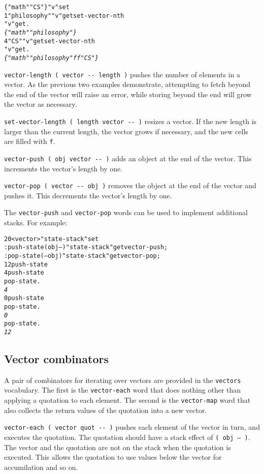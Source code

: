 \documentclass[english]{article}
\begin{document}
\begin{alltt}
\{ "math" "CS" \} "v" set
1 "philosophy" "v" get set-vector-nth
"v" get .
\emph{\{ "math" "philosophy" \}}
4 "CS" "v" get set-vector-nth
"v" get .
\emph{\{ "math" "philosophy" f f "CS" \}}
\end{alltt}
\texttt{vector-length ( vector -{}- length )} pushes the number of
elements in a vector. As the previous two examples demonstrate, attempting
to fetch beyond the end of the vector will raise an error, while storing
beyond the end will grow the vector as necessary.

\texttt{set-vector-length ( length vector -{}- )} resizes a vector.
If the new length is larger than the current length, the vector grows
if necessary, and the new cells are filled with \texttt{f}.

\texttt{vector-push ( obj vector -{}- )} adds an object at the end
of the vector. This increments the vector's length by one.

\texttt{vector-pop ( vector -{}- obj )} removes the object at the
end of the vector and pushes it. This decrements the vector's length
by one.

The \texttt{vector-push} and \texttt{vector-pop} words can be used to implement additional stacks. For example:

\begin{alltt}
20 <vector> "state-stack" set
: push-state ( obj -- ) "state-stack" get vector-push ;
: pop-state ( -- obj ) "state-stack" get vector-pop ;
12 push-state
4 push-state
pop-state .
\emph{4}
0 push-state
pop-state .
\emph{0}
pop-state .
\emph{12}
\end{alltt}

\subsection{Vector combinators}

A pair of combinators for iterating over vectors are provided in the \texttt{vectors} vocabulary. The first is the \texttt{vector-each} word that does nothing other than applying a quotation to each element. The second is the \texttt{vector-map} word that also collects the return values of the quotation into a new vector.

\texttt{vector-each ( vector quot -{}- )} pushes each element of the vector in turn, and executes the quotation. The quotation should have a stack effect of \texttt{( obj -- )}. The vector and the quotation are not on the stack when the quotation is executed. This allows the quotation to use values below the vector for accumilation and so on.
\end{document}
